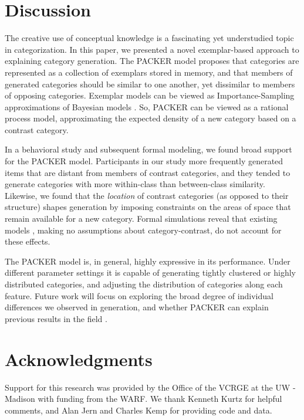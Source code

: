 \documentclass[10pt,letterpaper]{article}
\begin{document}
\section{Discussion}
The creative use of conceptual knowledge is a fascinating yet understudied topic in categorization. In this paper, we presented a novel exemplar-based approach to explaining category generation. The PACKER model proposes that categories are represented as a collection of exemplars stored in memory, and that members of generated categories should be similar to one another, yet dissimilar to members of opposing categories. Exemplar models can be viewed as Importance-Sampling approximations of Bayesian models \citep{shi10}. So, PACKER can be viewed as a rational process model, approximating the expected density of a new category based on a contrast category. 

In a behavioral study and subsequent formal modeling, we found broad support for the PACKER model. Participants in our study more frequently generated items that are distant from members of contrast categories, and they tended to generate categories with more within-class than between-class similarity. Likewise, we found that the \textit{location} of contrast categories (as opposed to their structure) shapes generation by imposing constraints on the areas of space that remain available for a new category. Formal simulations reveal that existing models \citep[see][]{jern2013probabilistic}, making no assumptions about category-contrast, do not account for these effects.

The PACKER model is, in general, highly expressive in its performance. Under different parameter settings it is capable of generating tightly clustered or highly distributed categories, and adjusting the distribution of categories along each feature. Future work will focus on exploring the broad degree of individual differences we observed in generation, and whether PACKER can explain previous results in the field \citep{ward1994structured,jern2013probabilistic}.

\section{Acknowledgments}
Support for this research was provided by the Office of the VCRGE at the UW - Madison with funding from the WARF. We thank Kenneth Kurtz for helpful comments, and Alan Jern and Charles Kemp for providing code and data.



\setlength{\bibleftmargin}{.025in}
\setlength{\bibindent}{-\bibleftmargin}

\end{document}

